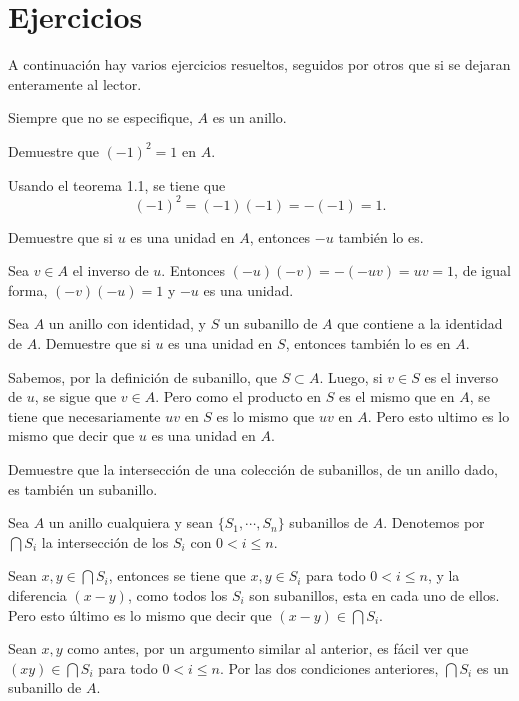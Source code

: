 %
\section{Ejercicios}%
\label{cha:Ejercicios}

{\noindent A continuación hay varios ejercicios resueltos, seguidos por otros que si se dejaran enteramente al lector. }

Siempre que no se especifique, $A$ es un anillo.
\begin{ejer} 
		Demuestre que $(-1)^2 = 1$ en $A$.
\end{ejer}
\begin{sol}
	Usando el teorema 1.1, se tiene que 
	\[(-1)^2 =  (-1)(-1)  = -(-1) = 1.\] 
\end{sol}
\begin{ejer} 
		Demuestre que si $u$ es una unidad en $A$, entonces $-u$ también lo es.
\end{ejer} 
\begin{sol}
	Sea $v \in A$ el inverso de $u$. Entonces $(-u)(-v) = -(-uv) = uv = 1$, de igual forma, $(-v)(-u) = 1$ y $-u$ es una unidad.
\end{sol}
\begin{ejer} 
		Sea $A$ un anillo con identidad, y $S$ un subanillo de $A$ que contiene a la identidad de $A$. Demuestre que si $u$ es una unidad en $S$, entonces también lo es en $A$.
\end{ejer} 
\begin{sol}
	Sabemos, por la definición de subanillo, que $S \subset A$. Luego, si $v \in S$ es el inverso de $u$, se sigue que $v \in A$. Pero como el producto en $S$ es el mismo que en $A$, se tiene que necesariamente $uv$ en $S$ es lo mismo que $uv$ en $A$. Pero esto ultimo es lo mismo que decir que $u$ es una unidad en $A$.
\end{sol}
\begin{ejer}\label{ejerintsub} 
		Demuestre que la intersección de una colección de subanillos, de un anillo dado, es también un subanillo.
\end{ejer} 
\begin{sol}
	Sea $A$ un anillo cualquiera y sean $\{S_1,\cdots,S_n\}$ sub\-anillos de $A$. Denotemos por $\bigcap S_i$ la intersección de los $S_i$ con $0 < i \leq n$.
	
	Sean $x,y \in \bigcap S_i$, entonces se tiene que $x,y \in S_i$ para todo $0 < i \leq n$, y la diferencia $(x-y)$, como todos los $S_i$ son subanillos, esta en cada uno de ellos. Pero esto último es lo mismo que decir que $(x-y) \in \bigcap S_i$.
	
	Sean $x,y$ como antes, por un argumento similar al anterior, es fácil ver que $(xy) \in \bigcap S_i$ para todo $0 < i \leq n$. Por las dos condiciones anteriores, $\bigcap S_i$ es un subanillo de $A$.
\end{sol}
